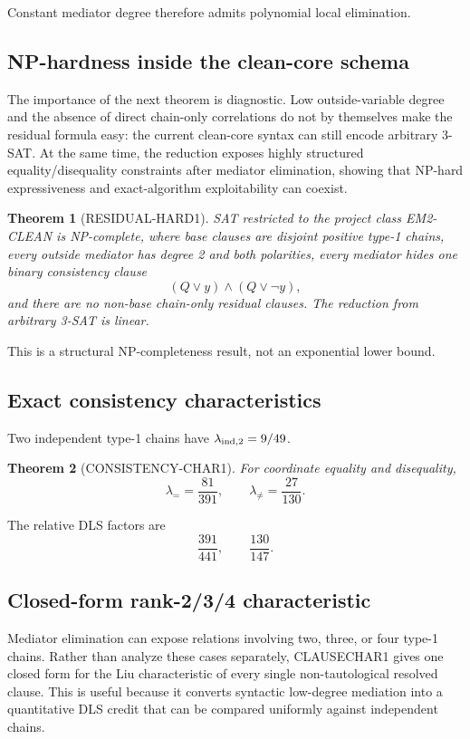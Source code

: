 \documentclass[11pt]{article}
\theoremstyle{plain}
\newtheorem{theorem}{Theorem}[section]
\theoremstyle{definition}
\theoremstyle{remark}
\begin{document}
Constant mediator degree therefore admits polynomial local elimination.

\subsection{NP-hardness inside the clean-core schema}

The importance of the next theorem is diagnostic. Low outside-variable
degree and the absence of direct chain-only correlations do not by themselves
make the residual formula easy: the current clean-core syntax can still encode
arbitrary 3-SAT. At the same time, the reduction exposes highly structured
equality/disequality constraints after mediator elimination, showing that
NP-hard expressiveness and exact-algorithm exploitability can coexist.

\begin{theorem}[RESIDUAL-HARD1]
SAT restricted to the project class EM2-CLEAN is NP-complete, where base
clauses are disjoint positive type-1 chains, every outside mediator has degree
2 and both polarities, every mediator hides one binary consistency clause
\[
(Q\vee y)\wedge(Q\vee\neg y),
\]
and there are no non-base chain-only residual clauses. The reduction from
arbitrary 3-SAT is linear.
\end{theorem}

This is a structural NP-completeness result, not an exponential lower bound.

\subsection{Exact consistency characteristics}

Two independent type-1 chains have $\lambda_{\rm ind,2}=9/49$.

\begin{theorem}[CONSISTENCY-CHAR1]
For coordinate equality and disequality,
\[
\boxed{\lambda_{=} = \frac{81}{391}},
\qquad
\boxed{\lambda_{\ne} = \frac{27}{130}}.
\]
\end{theorem}

The relative DLS factors are
\[
\boxed{\frac{391}{441}},
\qquad
\boxed{\frac{130}{147}}.
\]

\subsection{Closed-form rank-2/3/4 characteristic}

Mediator elimination can expose relations involving two, three, or four
type-1 chains. Rather than analyze these cases separately, CLAUSECHAR1 gives
one closed form for the Liu characteristic of every single non-tautological
resolved clause. This is useful because it converts syntactic low-degree
mediation into a quantitative DLS credit that can be compared uniformly
against independent chains.
\end{document}
